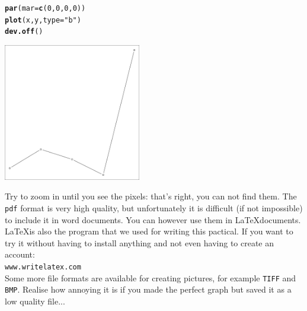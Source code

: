 \documentclass{article}\usepackage[]{graphicx}\usepackage[]{color}
\makeatletter
\newcommand{\hlnum}[1]{\textcolor[rgb]{0.686,0.059,0.569}{#1}}%
\newcommand{\hlstr}[1]{\textcolor[rgb]{0.192,0.494,0.8}{#1}}%
\newcommand{\hlstd}[1]{\textcolor[rgb]{0.345,0.345,0.345}{#1}}%
\newcommand{\hlkwc}[1]{\textcolor[rgb]{0.333,0.667,0.333}{#1}}%
\newcommand{\hlkwd}[1]{\textcolor[rgb]{0.737,0.353,0.396}{\textbf{#1}}}%
\newenvironment{kframe}{%
 \def\at@end@of@kframe{}%
 \ifinner\ifhmode%
  \def\at@end@of@kframe{\end{minipage}}%
  \begin{minipage}{\columnwidth}%
 \fi\fi%
 \def\FrameCommand##1{\hskip\@totalleftmargin \hskip-\fboxsep
 \colorbox{shadecolor}{##1}\hskip-\fboxsep
     \hskip-\linewidth \hskip-\@totalleftmargin \hskip\columnwidth}%
 \MakeFramed {\advance\hsize-\width
   \@totalleftmargin\z@ \linewidth\hsize
   \@setminipage}}%
 {\par\unskip\endMakeFramed%
 \at@end@of@kframe}
\newenvironment{knitrout}{}{} %
\makeatother
\begin{document}
\begin{mdframed}
\begin{knitrout}
\begin{kframe}
\begin{alltt}
\hlkwd{par}\hlstd{(}\hlkwc{mar}\hlstd{=}\hlkwd{c}\hlstd{(}\hlnum{0}\hlstd{,}\hlnum{0}\hlstd{,}\hlnum{0}\hlstd{,}\hlnum{0}\hlstd{))}
\hlkwd{plot}\hlstd{(x,y,}\hlkwc{type}\hlstd{=}\hlstr{"b"}\hlstd{)}
\hlkwd{dev.off}\hlstd{()}
\end{alltt}
\end{kframe}
\end{knitrout}
\begin{center}
\includegraphics[width=0.45\textwidth]{pdf1.pdf}
\end{center}
Try to zoom in until you see the pixels: that's right, you can not find them. The \texttt{pdf} format is very high quality, but unfortunately it is difficult (if not impossible) to include it in word documents. You can however use them in \LaTeX documents. \LaTeX is also the program that we used for writing this pactical. If you want to try it without having to install anything and not even having to create an account:\\
\texttt{www.writelatex.com} \\
Some more file formats are available for creating pictures, for example \texttt{TIFF} and \texttt{BMP}. Realise how annoying it is if you made the perfect graph but saved it as a low quality file...
\end{mdframed}
\end{document}
